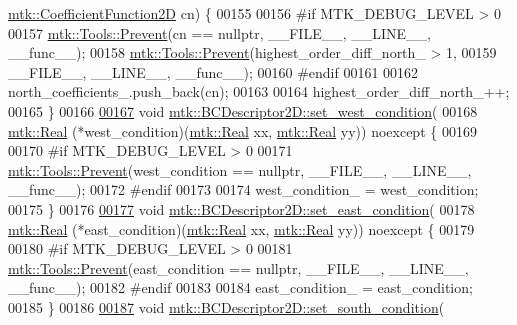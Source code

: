 \begin{DoxyCode}
      \hyperlink{group__c07-mim__ops_gad9e1c0ace886b0029aefffa5f320e852}{mtk::CoefficientFunction2D} cn) \{
00155 
00156 \textcolor{preprocessor}{  #if MTK\_DEBUG\_LEVEL > 0}
00157   \hyperlink{classmtk_1_1Tools_a332324c6f25e66be9dff48c5987a3b9f}{mtk::Tools::Prevent}(cn == \textcolor{keyword}{nullptr}, \_\_FILE\_\_, \_\_LINE\_\_, \_\_func\_\_);
00158   \hyperlink{classmtk_1_1Tools_a332324c6f25e66be9dff48c5987a3b9f}{mtk::Tools::Prevent}(highest\_order\_diff\_north\_ > 1,
00159                       \_\_FILE\_\_, \_\_LINE\_\_, \_\_func\_\_);
00160 \textcolor{preprocessor}{  #endif}
00161 
00162   north\_coefficients\_.push\_back(cn);
00163 
00164   highest\_order\_diff\_north\_++;
00165 \}
00166 
\hypertarget{mtk__bc__descriptor__2d_8cc_source_l00167}{}\hyperlink{classmtk_1_1BCDescriptor2D_a006050efe15b1be75b36a74a23051392}{00167} \textcolor{keywordtype}{void} \hyperlink{classmtk_1_1BCDescriptor2D_a006050efe15b1be75b36a74a23051392}{mtk::BCDescriptor2D::set\_west\_condition}(
00168     \hyperlink{group__c01-roots_gac080bbbf5cbb5502c9f00405f894857d}{mtk::Real} (*west\_condition)(\hyperlink{group__c01-roots_gac080bbbf5cbb5502c9f00405f894857d}{mtk::Real} xx, \hyperlink{group__c01-roots_gac080bbbf5cbb5502c9f00405f894857d}{mtk::Real} yy)) noexcept \{
00169 
00170 \textcolor{preprocessor}{  #if MTK\_DEBUG\_LEVEL > 0}
00171   \hyperlink{classmtk_1_1Tools_a332324c6f25e66be9dff48c5987a3b9f}{mtk::Tools::Prevent}(west\_condition == \textcolor{keyword}{nullptr}, \_\_FILE\_\_, \_\_LINE\_\_, \_\_func\_\_);
00172 \textcolor{preprocessor}{  #endif}
00173 
00174   west\_condition\_ = west\_condition;
00175 \}
00176 
\hypertarget{mtk__bc__descriptor__2d_8cc_source_l00177}{}\hyperlink{classmtk_1_1BCDescriptor2D_a4ba8690e845f59a1507b056f3fc8061e}{00177} \textcolor{keywordtype}{void} \hyperlink{classmtk_1_1BCDescriptor2D_a4ba8690e845f59a1507b056f3fc8061e}{mtk::BCDescriptor2D::set\_east\_condition}(
00178     \hyperlink{group__c01-roots_gac080bbbf5cbb5502c9f00405f894857d}{mtk::Real} (*east\_condition)(\hyperlink{group__c01-roots_gac080bbbf5cbb5502c9f00405f894857d}{mtk::Real} xx, \hyperlink{group__c01-roots_gac080bbbf5cbb5502c9f00405f894857d}{mtk::Real} yy)) noexcept \{
00179 
00180 \textcolor{preprocessor}{  #if MTK\_DEBUG\_LEVEL > 0}
00181   \hyperlink{classmtk_1_1Tools_a332324c6f25e66be9dff48c5987a3b9f}{mtk::Tools::Prevent}(east\_condition == \textcolor{keyword}{nullptr}, \_\_FILE\_\_, \_\_LINE\_\_, \_\_func\_\_);
00182 \textcolor{preprocessor}{  #endif}
00183 
00184   east\_condition\_ = east\_condition;
00185 \}
00186 
\hypertarget{mtk__bc__descriptor__2d_8cc_source_l00187}{}\hyperlink{classmtk_1_1BCDescriptor2D_a408f159cc44d7ee610191efb8ed48b2a}{00187} \textcolor{keywordtype}{void} \hyperlink{classmtk_1_1BCDescriptor2D_a408f159cc44d7ee610191efb8ed48b2a}{mtk::BCDescriptor2D::set\_south\_condition}(

\end{DoxyCode}
